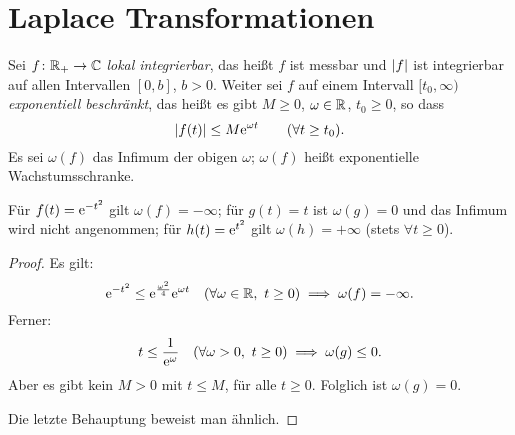 \documentclass[a4paper,twoside,DIV15,BCOR12mm]{scrbook}
\begin{document}

\section{Laplace Transformationen}

Sei $f\colon\mathbb{R}_+\to\mathbb{C}$ \textit{lokal integrierbar}, das heißt $f$ ist messbar und $\left\lvert f\right\lvert$ ist integrierbar auf allen Intervallen $[0,b]$, $b>0$. Weiter sei $f$ auf einem Intervall $[t_0,\infty)$ \textit{exponentiell beschränkt}, das heißt es gibt $M\geq 0$, $\omega\in\mathbb{R}$, $t_0\geq 0$, so dass
\[\left\lvert f(t)\right\lvert\leq M\mathrm{e}^{\omega t}\qquad(\forall t\geq t_0).\]
Es sei $\omega(f)$ das Infimum der obigen $\omega$; $\omega(f)$ heißt exponentielle Wachstumsschranke.

\begin{bem*} Für $f(t)=\mathrm{e}^{-t^2}$ gilt $\omega(f)=-\infty$; für $g(t)=t$ ist $\omega(g)=0$ und das Infimum wird nicht angenommen; für $h(t)=\mathrm{e}^{t^2}$ gilt $\omega(h)=+\infty$ (stets $\forall t\geq 0$).
\end{bem*}
\begin{proof}
Es gilt:
\[\mathrm{e}^{-t^2}\leq \mathrm{e}^{\frac{\omega^2}{4}}\mathrm{e}^{\omega t}\quad(\forall\omega\in\mathbb{R},\ t\geq 0)\implies\omega(f)=-\infty.\]
Ferner:
\[t\leq\frac{1}{\e^\omega}\quad(\forall\omega>0,\ t\geq0)\folgt\omega(g)\leq 0.\]
Aber es gibt kein $M>0$ mit $t\leq M$, für alle $t\geq 0$. Folglich ist $\omega(g)=0$.

Die letzte Behauptung beweist man ähnlich.
\end{proof}
\end{document}
